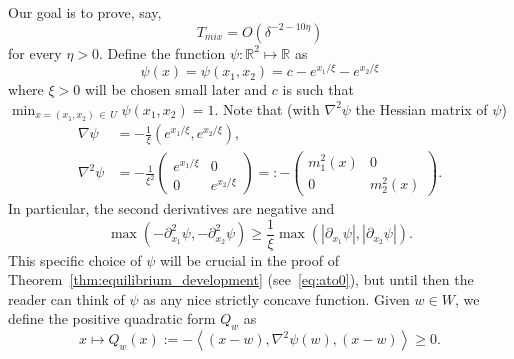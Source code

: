 \documentclass[10pt]{amsart}
\theoremstyle{definition}\newtheorem{defi}[theo]{Definition}\newtheorem{rema}[theo]{Remark}\newtheorem{exam}[theo]{Example}\newtheorem{exem}[theo]{Example}\newtheorem{nota}[theo]{Notation}
\newcommand{\R}{\mathbb{R}}
\begin{document}
Our goal is to prove, say,
\begin{equation}\label{Tmixub}
T_{mix}=O\left(\delta^{-2-10\eta}\right)
\end{equation}
for every $\eta>0$. Define the function $\psi:\R^2\mapsto \R$ as
\begin{equation}\label{eq:psi}
\psi(x)= \psi(x_1,x_2)=c-e^{ x_1/\xi}-e^{x_2/\xi}
\end{equation}
where $\xi>0$ will be chosen small later and $c$ is such that $\min_{x=(x_1,x_2)\,\in\,U}\psi(x_1,x_2)=1$. Note that (with $\nabla^2\psi$ the Hessian matrix of $\psi$)
\begin{equation}\label{eq:gradpsi}
\begin{split}
\nabla\psi &=-\frac1\xi\left(e^{x_1/\xi},e^{x_2/\xi}\right), \\ \nabla^2\psi &=-\frac1{\xi^2}
\left(
\begin{array}{ll}
e^{x_1/\xi}& 0\\
0 & e^{x_2/\xi}
\end{array}
\right)=:-\left(
\begin{array}{ll}
m^2_1(x)& 0\\
0 & m_2^2(x)
\end{array}
\right).
\end{split}
\end{equation}
In particular, the second derivatives are negative and
\begin{equation}\label{eq:confrontoderivate}
\max\left(-\partial^2_{x_1} \psi,-\partial^2_{x_2}\psi\right)\ge \frac1\xi \max\left(|\partial_{x_1}\psi|,|\partial_{x_2}\psi|\right).
\end{equation}
This specific choice of $\psi$ will be crucial in the proof of Theorem~\ref{thm:equilibrium_development} (see~\eqref{eq:ato0}), but until then the reader can think of $\psi$ as any nice strictly concave function. Given $w\in W$, we define the positive quadratic form $Q_w$ as
\begin{equation}\label{eq:quadform}
x\mapsto Q_w(x):=-\left\langle(x-w),\nabla^2\psi(w), (x-w)\right\rangle\ge 0.
\end{equation}
\end{document}
